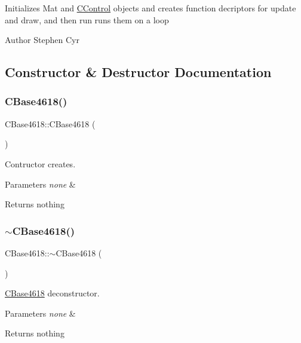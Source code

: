 Initializes Mat and \hyperlink{class_c_control}{C\+Control} objects and creates function decriptors for update and draw, and then run runs them on a loop

\begin{DoxyAuthor}{Author}
Stephen Cyr 
\end{DoxyAuthor}


\subsection{Constructor \& Destructor Documentation}
\hypertarget{class_c_base4618_abe2aad021452c08dd4a5726b44c5a0b7}{}\label{class_c_base4618_abe2aad021452c08dd4a5726b44c5a0b7} 
\subsubsection{\texorpdfstring{C\+Base4618()}{CBase4618()}}
{\footnotesize\ttfamily C\+Base4618\+::\+C\+Base4618 (\begin{DoxyParamCaption}{ }\end{DoxyParamCaption})}



Contructor creates. 


\begin{DoxyParams}{Parameters}
{\em none} & \\
\hline
\end{DoxyParams}
\begin{DoxyReturn}{Returns}
nothing 
\end{DoxyReturn}
\hypertarget{class_c_base4618_a22c0de299cef06c4ef49ace3a5b0be52}{}\label{class_c_base4618_a22c0de299cef06c4ef49ace3a5b0be52} 
\subsubsection{\texorpdfstring{$\sim$\+C\+Base4618()}{~CBase4618()}}
{\footnotesize\ttfamily C\+Base4618\+::$\sim$\+C\+Base4618 (\begin{DoxyParamCaption}{ }\end{DoxyParamCaption})}



\hyperlink{class_c_base4618}{C\+Base4618} deconstructor. 


\begin{DoxyParams}{Parameters}
{\em none} & \\
\hline
\end{DoxyParams}
\begin{DoxyReturn}{Returns}
nothing 
\end{DoxyReturn}


